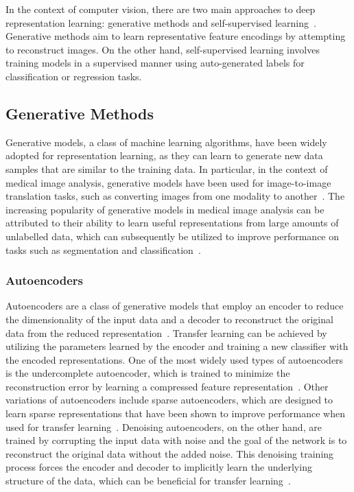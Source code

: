 In the context of computer vision, there are two main approaches to deep representation learning: generative methods and self-supervised learning~\citep{bengio2013representation}. Generative methods aim to learn representative feature encodings by attempting to reconstruct images. On the other hand, self-supervised learning involves training models in a supervised manner using auto-generated labels for classification or regression tasks.

\subsection{Generative Methods}
\label{subsec:generative_methods}
Generative models, a class of machine learning algorithms, have been widely adopted for representation learning, as they can learn to generate new data samples that are similar to the training data. In particular, in the context of medical image analysis, generative models have been used for image-to-image translation tasks, such as converting images from one modality to another~\citep{kaji2019overview}. The increasing popularity of generative models in medical image analysis can be attributed to their ability to learn useful representations from large amounts of unlabelled data, which can subsequently be utilized to improve performance on tasks such as segmentation and classification~\citep{yi2019generative}.

\subsubsection{Autoencoders}
\label{subsubsec:autoencoders}
Autoencoders are a class of generative models that employ an encoder to reduce the dimensionality of the input data and a decoder to reconstruct the original data from the reduced representation~\citep{kramer1991nonlinear}. Transfer learning can be achieved by utilizing the parameters learned by the encoder and training a new classifier with the encoded representations. One of the most widely used types of autoencoders is the undercomplete autoencoder, which is trained to minimize the reconstruction error by learning a compressed feature representation~\citep{goodfellow2016deep}. Other variations of autoencoders include sparse autoencoders, which are designed to learn sparse representations that have been shown to improve performance when used for transfer learning~\citep{makhzani2013k}. Denoising autoencoders, on the other hand, are trained by corrupting the input data with noise and the goal of the network is to reconstruct the original data without the added noise. This denoising training process forces the encoder and decoder to implicitly learn the underlying structure of the data, which can be beneficial for transfer learning~\citep{bengio2013generalized}.

